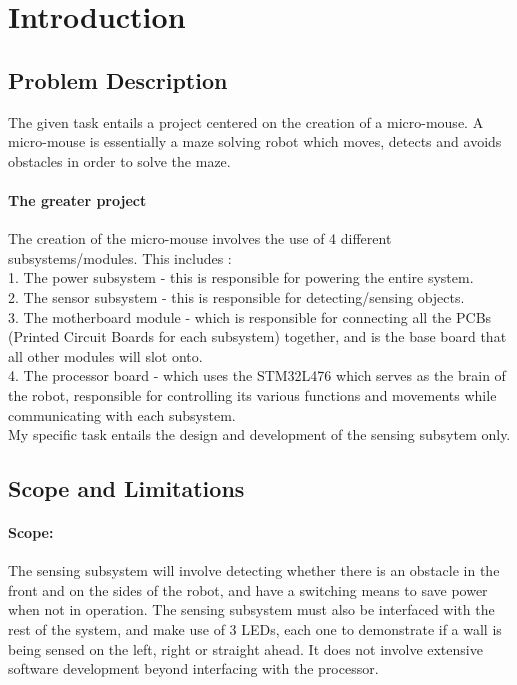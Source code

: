 \documentclass[class=report,11pt,crop=false]{standalone}
\begin{document}
\chapter{Introduction} \label{ch:introduction}
\vspace{-1cm}

\section{Problem Description}
The given task entails a project centered on the creation of a micro-mouse. A micro-mouse is essentially a maze solving robot which moves, detects and avoids obstacles in order to solve the maze.
\subsubsection{The greater project}
The creation of the micro-mouse involves the use of 4 different subsystems/modules. This includes : \\
1. The power subsystem - this is responsible for powering the entire system. \\2. The sensor subsystem - this is responsible for detecting/sensing objects.\\3. The motherboard module - which is responsible for connecting all the PCBs (Printed Circuit Boards for each subsystem) together, and  is the base board that all other modules will slot onto.\\4. The processor board - which uses the STM32L476 which serves as the brain of the robot, responsible for controlling its various functions and movements while communicating with each subsystem.\\
My specific task entails the design and development of the sensing subsytem only.
\section{Scope and Limitations}
\subsubsection{Scope:}
 The sensing subsystem will involve detecting whether there is an obstacle in the front and on the sides of the robot, and have a switching means to save power when not in operation. The sensing subsystem must also be interfaced with the rest of the system, and make use of 3 LEDs, each one to demonstrate if a wall is being sensed on the left, right or straight ahead. It does not involve extensive software development beyond interfacing with the processor.
\end{document}
